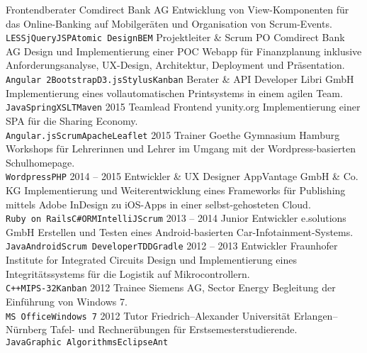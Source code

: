 \documentclass[9pt]{developercv} %
\begin{document}
\begin{entrylist}
{    }
  \entry
		{}
		{Frontendberater}
		{Comdirect Bank AG}
		{
      Entwicklung von View-Komponenten für das Online-Banking auf Mobilgeräten und Organisation von Scrum-Events.\\
      \texttt{LESS}\slashsep\texttt{jQuery}\slashsep\texttt{JSP}\slashsep\texttt{Atomic Design}\slashsep\texttt{BEM}
    }
  \entry
		{}
		{Projektleiter \& Scrum PO}
		{Comdirect Bank AG}
		{
      Design und Implementierung einer POC Webapp für Finanzplanung inklusive Anforderungsanalyse, UX-Design, Architektur,
      Deployment und Präsentation.\\
      \texttt{Angular 2}\slashsep\texttt{Bootstrap}\slashsep\texttt{D3.js}\slashsep\texttt{Stylus}\slashsep\texttt{Kanban}
    }
  \entry
		{}
		{Berater \& API Developer}
		{Libri GmbH}
		{
      Implementierung eines vollautomatischen Printsystems in einem agilen Team.\\
      \texttt{Java}\slashsep\texttt{Spring}\slashsep\texttt{XSLT}\slashsep\texttt{Maven}
    }
  \entry
		{2015}
		{Teamlead Frontend}
		{yunity.org}
		{
      Implementierung einer SPA für die Sharing Economy.\\
      \texttt{Angular.js}\slashsep\texttt{Scrum}\slashsep\texttt{Apache}\slashsep\texttt{Leaflet}
    }
  \entry
		{2015}
		{Trainer}
		{Goethe Gymnasium Hamburg}
		{
      Workshops für Lehrerinnen und Lehrer im Umgang mit der Wordpress-basierten Schulhomepage.\\
      \texttt{Wordpress}\slashsep\texttt{PHP}
    }
  \entry
		{2014 -- 2015}
		{Entwickler \& UX Designer}
		{AppVantage GmbH \& Co. KG}
		{
      Implementierung und Weiterentwicklung eines Frameworks für Publishing mittels Adobe InDesign zu iOS-Apps in
      einer selbst-gehosteten Cloud.\\
      \texttt{Ruby on Rails}\slashsep\texttt{C\#}\slashsep\texttt{ORM}\slashsep\texttt{IntelliJ}\slashsep\texttt{Scrum}
    }
  \entry
		{2013 -- 2014}
		{Junior Entwickler}
		{e.solutions GmbH}
		{
      Erstellen und Testen eines Android-basierten Car-Infotainment-Systems.\\
      \texttt{Java}\slashsep\texttt{Android}\slashsep\texttt{Scrum Developer}\slashsep\texttt{TDD}\slashsep\texttt{Gradle}
    }
  \entry
		{2012 -- 2013}
		{Entwickler}
		{Fraunhofer Institute for Integrated Circuits}
		{
      Design und Implementierung eines Integritätssystems für die Logistik auf Mikrocontrollern.\\
      \texttt{C++}\slashsep\texttt{MIPS-32}\slashsep\texttt{Kanban}
    }
  \entry
 		{2012}
 		{Trainee}
 		{Siemens AG, Sector Energy}
 		{
      Begleitung der Einführung von Windows 7.\\
      \texttt{MS Office}\slashsep\texttt{Windows 7}
    }
  \entry
 		{2012}
 		{Tutor}
 		{Friedrich–Alexander Universität Erlangen–Nürnberg}
 		{
      Tafel- und Rechnerübungen für Erstsemesterstudierende.\\
      \texttt{Java}\slashsep\texttt{Graphic Algorithms}\slashsep\texttt{Eclipse}\slashsep\texttt{Ant}
    }
\end{entrylist}
\end{document}
